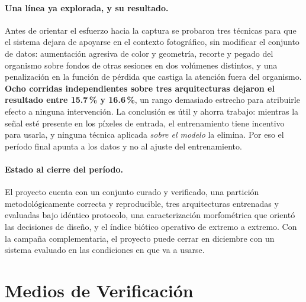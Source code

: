 \documentclass[onecolumn]{article}
\begin{document}
\paragraph{Una línea ya explorada, y su resultado.} Antes de orientar el esfuerzo hacia la captura se probaron tres técnicas para que el sistema dejara de apoyarse en el contexto fotográfico, sin modificar el conjunto de datos: aumentación agresiva de color y geometría, recorte y pegado del organismo sobre fondos de otras sesiones en dos volúmenes distintos, y una penalización en la función de pérdida que castiga la atención fuera del organismo. \textbf{Ocho corridas independientes sobre tres arquitecturas dejaron el resultado entre 15.7\,\% y 16.6\,\%}, un rango demasiado estrecho para atribuirle efecto a ninguna intervención. La conclusión es útil y ahorra trabajo: mientras la señal esté presente en los píxeles de entrada, el entrenamiento tiene incentivo para usarla, y ninguna técnica aplicada \emph{sobre el modelo} la elimina. Por eso el período final apunta a los datos y no al ajuste del entrenamiento.

\paragraph{Estado al cierre del período.} El proyecto cuenta con un conjunto curado y verificado, una partición metodológicamente correcta y reproducible, tres arquitecturas entrenadas y evaluadas bajo idéntico protocolo, una caracterización morfométrica que orientó las decisiones de diseño, y el índice biótico operativo de extremo a extremo. Con la campaña complementaria, el proyecto puede cerrar en diciembre con un sistema evaluado en las condiciones en que va a usarse.

\section{Medios de Verificación}
\end{document}
